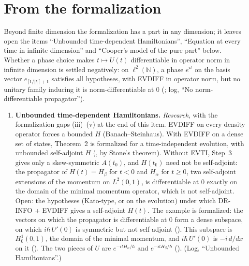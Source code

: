 \documentclass[11pt]{article}
\begin{document}
\section*{From the formalization}
\noindent Beyond finite dimension the formalization has a part in any dimension; it leaves
open the items ``Unbounded time-dependent Hamiltonians'', ``Equation at every time in infinite
dimension'' and ``Cooper's model of the pure part'' below. Whether a phase choice makes $t\mapsto U(t)$
differentiable in operator norm in infinite dimension is settled negatively: on
$\ell^2(\mathbb{N})$, a phase $e^{it}$ on the basis vector $e_{\lceil 1/|t|\rceil+1}$ satisfies
all hypotheses, with EVDIFF in operator norm, but no unitary family inducing it is
norm-differentiable at $0$ (; log, ``No norm-differentiable
propagator'').
\begin{enumerate}
\item \textbf{Unbounded time-dependent Hamiltonians.} \emph{Research}, with the
  formalization gaps (iii)--(v) at the end of this item. EVDIFF on every density operator forces a
  bounded $H$ (Banach--Steinhaus). With EVDIFF on a dense set of states, Theorem~2 is formalized
  for a time-independent evolution, with unbounded self-adjoint $H$
  (, by Stone's theorem). Without EVTI, Step~3 gives only a
  skew-symmetric $A(t_0)$, and $H(t_0)$ need not be self-adjoint: the propagator of
  $H(t) = H_\beta$ for $t < 0$ and $H_\alpha$ for $t \ge 0$, two self-adjoint extensions of the
  momentum on $L^2(0,1)$, is differentiable at $0$ exactly on the domain of the minimal momentum
  operator, which is not self-adjoint. Open: the hypotheses (Kato-type, or on the evolution)
  under which DR-INFO + EVDIFF gives a self-adjoint $H(t)$. The example is formalized: the vectors
  on which the propagator is differentiable at $0$ form a dense subspace, on which
  $i\hbar\,U'(0)$ is symmetric but not self-adjoint ().
  This subspace is $H^1_0(0,1)$, the domain of the minimal momentum, and $i\hbar\,U'(0)$ is
  $-i\,d/dx$ on it (). The two pieces of $U$ are
  $e^{-itH_\alpha/\hbar}$ and $e^{-itH_\beta/\hbar}$
  ().
  (Log, ``Unbounded Hamiltonians''.)


\end{enumerate}
\end{document}

